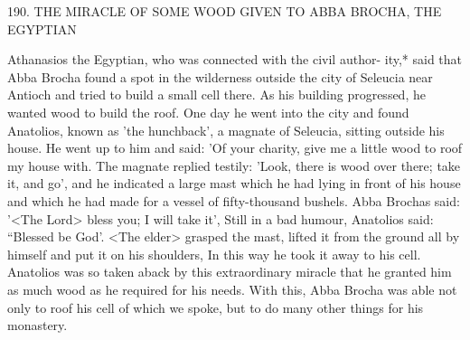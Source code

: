 190.
THE MIRACLE OF SOME WOOD GIVEN TO
ABBA BROCHA, THE EGYPTIAN

Athanasios the Egyptian, who was connected with the civil author-
ity,* said that Abba Brocha found a spot in the wilderness outside
the city of Seleucia near Antioch and tried to build a small cell
there.
As his building progressed, he wanted wood to build the roof.
One day he went into the city and found Anatolios, known as 'the
hunchback', a magnate of Seleucia, sitting outside his house.
He
went up to him and said: 'Of your charity, give me a little wood to
roof my house with.
The magnate replied testily: 'Look, there is
wood over there; take it, and go', and he indicated a large mast
which he had lying in front of his house and which he had made for
a vessel of fifty-thousand bushels.
Abba Brochas said: '<The Lord>
bless you; I will take it', Still in a bad humour, Anatolios said:
“Blessed be God'.
<The elder> grasped the mast, lifted it from the
ground all by himself and put it on his shoulders, In this way he
took it away to his cell.
Anatolios was so taken aback by this
extraordinary miracle that he granted him as much wood as he
required for his needs.
With this, Abba Brocha was able not only to
roof his cell of which we spoke, but to do many other things for his
monastery.

